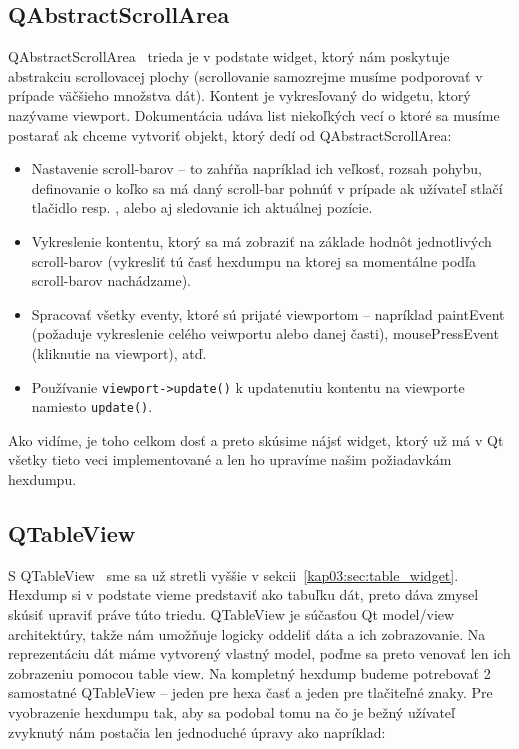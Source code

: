 \subsection*{QAbstractScrollArea}
QAbstractScrollArea~\cite{qabstractscrollarea} trieda je v podstate widget, ktorý nám poskytuje abstrakciu scrollovacej plochy (scrollovanie samozrejme musíme podporovať v prípade väčšieho množstva dát). Kontent je vykresľovaný do widgetu, ktorý nazývame viewport. Dokumentácia udáva list niekoľkých vecí o ktoré sa musíme postarať ak chceme vytvoriť objekt, ktorý dedí od QAbstractScrollArea:
\begin{itemize}
\item Nastavenie scroll-barov -- to zahŕňa napríklad ich veľkosť, rozsah pohybu, definovanie o koľko sa má daný scroll-bar pohnúť v prípade ak užívateľ stlačí tlačidlo  resp. , alebo aj sledovanie ich aktuálnej pozície.
\item Vykreslenie kontentu, ktorý sa má zobraziť na základe hodnôt jednotlivých scroll-barov (vykresliť tú časť hexdumpu na ktorej sa momentálne podľa scroll-barov nachádzame).
\item Spracovať všetky eventy, ktoré sú prijaté viewportom -- napríklad paintEvent (požaduje vykreslenie celého veiwportu alebo danej časti), mousePressEvent (kliknutie na viewport), atď.
\item Používanie \texttt{viewport->update()} k updatenutiu kontentu na viewporte namiesto \texttt{update()}.
\end{itemize}

Ako vidíme, je toho celkom dosť a preto skúsime nájsť widget, ktorý už má v Qt všetky tieto veci implementované a len ho upravíme našim požiadavkám hexdumpu.

\subsection*{QTableView}
S QTableView~\cite{qtableview} sme sa už stretli vyššie v sekcii~\ref{kap03:sec:table_widget}. Hexdump si v podstate vieme predstaviť ako tabuľku dát, preto dáva zmysel skúsiť upraviť práve túto triedu. QTableView je súčasťou Qt model/view architektúry, takže nám umožňuje logicky oddeliť dáta a ich zobrazovanie. Na reprezentáciu dát máme vytvorený vlastný model, poďme sa preto venovať len ich zobrazeniu pomocou table view. Na kompletný hexdump budeme potrebovať 2 samostatné QTableView -- jeden pre hexa časť a jeden pre tlačiteľné znaky. Pre vyobrazenie hexdumpu tak, aby sa podobal tomu na čo je bežný užívateľ zvyknutý nám postačia len jednoduché úpravy ako napríklad:

